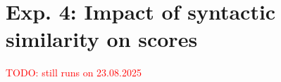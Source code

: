 \section{Exp. 4: Impact of syntactic similarity on \impAppr{} scores}
\label{sec:res_syn_sim_impact}

\textcolor{red}{TODO: still runs on 23.08.2025}

%     

%     

%     

%     

%     

%     
